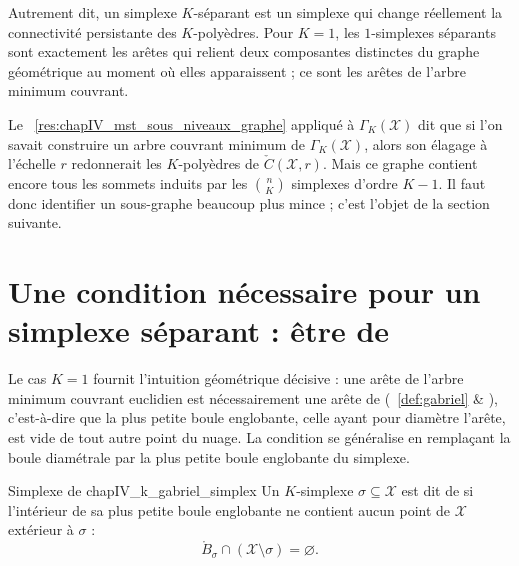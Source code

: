 
Autrement dit, un simplexe $K$-séparant est un simplexe qui change réellement la connectivité persistante des $K$-polyèdres. Pour $K=1$, les $1$-simplexes séparants sont exactement les arêtes qui relient deux composantes distinctes du graphe géométrique au moment où elles apparaissent ; ce sont les arêtes de l'arbre minimum couvrant.

Le \Res~\ref{res:chapIV_mst_sous_niveaux_graphe} appliqué à $\Gamma_K(\mathcal X)$ dit que si l'on savait construire un arbre couvrant minimum de $\Gamma_K(\mathcal X)$, alors son élagage à l'échelle $r$ redonnerait les $K$-polyèdres de $\check C(\mathcal X,r)$. Mais ce graphe contient encore tous les sommets induits par les $\binom n{K}$ simplexes d'ordre $K-1$. Il faut donc identifier un sous-graphe beaucoup plus mince ; c'est l'objet de la section suivante.

\section{Une condition nécessaire pour un simplexe séparant : être de }
\label{sec:chapIV_k_gabriel}

Le cas $K=1$ fournit l'intuition géométrique décisive : une arête de l'arbre minimum couvrant euclidien est nécessairement une arête de  (\Def~\ref{def:gabriel} \& ), c'est-à-dire que la plus petite boule englobante, celle ayant pour diamètre l'arête, est vide de tout autre point du nuage. La condition se généralise en remplaçant la boule diamétrale par la plus petite boule englobante du simplexe.

\begin{Definition}{Simplexe de }{chapIV_k_gabriel_simplex}
Un $K$-simplexe $\sigma\subseteq\mathcal X$ est dit de \emph{} si l'intérieur de sa plus petite boule englobante ne contient aucun point de $\mathcal X$ extérieur à $\sigma$ :
\[
\boxed{
    \mathring{B}_\sigma\cap(\mathcal X\setminus\sigma)=\varnothing.
    }
\]
\end{Definition}

